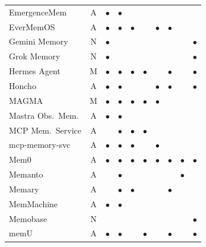 \begin{table}[!t]
\begin{tabular}{@{}lc cccccccc@{}}
EmergenceMem         & A & $\bullet$ & $\bullet$ &           &           &           &           &           &           \\
EverMemOS            & A & $\bullet$ & $\bullet$ & $\bullet$ &           & $\bullet$ & $\bullet$ &           &           \\
Gemini Memory        & N & $\bullet$ &           &           &           &           &           &           & $\bullet$ \\
Grok Memory          & N & $\bullet$ &           &           &           &           &           &           & $\bullet$ \\
Hermes Agent         & M & $\bullet$ & $\bullet$ & $\bullet$ & $\bullet$ &           & $\bullet$ &           & $\bullet$ \\
Honcho               & A & $\bullet$ & $\bullet$ &           &           & $\bullet$ & $\bullet$ &           & $\bullet$ \\
MAGMA                & M & $\bullet$ & $\bullet$ & $\bullet$ & $\bullet$ & $\bullet$ &           &           &           \\
Mastra Obs.\ Mem.    & A & $\bullet$ & $\bullet$ &           &           &           &           &           &           \\
MCP Mem.\ Service    & A &           & $\bullet$ & $\bullet$ & $\bullet$ &           &           &           &           \\
mcp-memory-svc        & A & $\bullet$ & $\bullet$ & $\bullet$ &           & $\bullet$ &           &           &           \\
Mem0                 & A & $\bullet$ & $\bullet$ & $\bullet$ & $\bullet$ & $\bullet$ & $\bullet$ & $\bullet$ & $\bullet$ \\
Memanto              & A &           & $\bullet$ &           &           &           &           & $\bullet$ &           \\
Memary               & A &           & $\bullet$ & $\bullet$ &           &           & $\bullet$ &           &           \\
MemMachine           & A & $\bullet$ & $\bullet$ &           &           &           &           &           &           \\
Memobase             & N &           &           &           &           &           &           &           & $\bullet$ \\
memU                 & A & $\bullet$ & $\bullet$ &           & $\bullet$ &           & $\bullet$ &           & $\bullet$ \\

\end{tabular}
\end{table}
